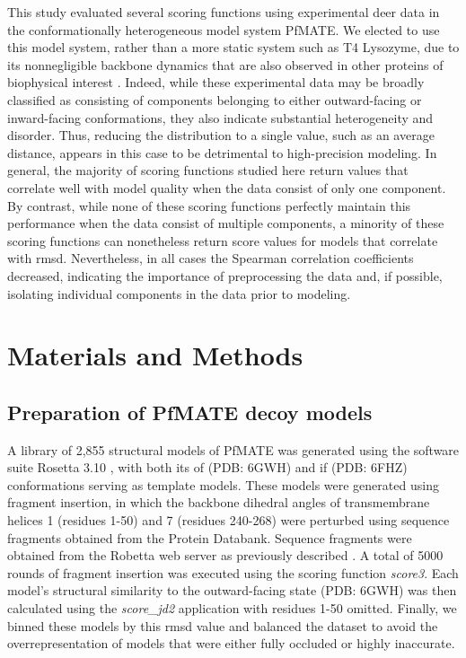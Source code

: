 This study evaluated several scoring functions using experimental \gls{deer} data in the conformationally heterogeneous model system PfMATE. We elected to use this model system, rather than a more static system such as T4 Lysozyme, due to its nonnegligible backbone dynamics that are also observed in other proteins of biophysical interest \citep*{Collauto2017, Dastvan2019, Evans2020, Martens2016, Verhalen2017a}. Indeed, while these experimental data may be broadly classified as consisting of components belonging to either outward-facing or inward-facing conformations, they also indicate substantial heterogeneity and disorder. Thus, reducing the distribution to a single value, such as an average distance, appears in this case to be detrimental to high-precision modeling. In general, the majority of scoring functions studied here return values that correlate well with model quality when the data consist of only one component. By contrast, while none of these scoring functions perfectly maintain this performance when the data consist of multiple components, a minority of these scoring functions can nonetheless return score values for models that correlate with \gls{rmsd}. Nevertheless, in all cases the Spearman correlation coefficients decreased, indicating the importance of preprocessing the data and, if possible, isolating individual components in the data prior to modeling.

\section{Materials and Methods}\label{sec:scoring_methods}

\subsection{Preparation of PfMATE decoy models}

A library of 2,855 structural models of PfMATE was generated using the software suite Rosetta 3.10 \citep*{Leaver-fay2011, Leman2020}, with both its \gls{of} (PDB: 6GWH) and \gls{if} (PDB: 6FHZ) conformations serving as template models. These models were generated using fragment insertion, in which the backbone dihedral angles of transmembrane helices 1 (residues 1-50) and 7 (residues 240-268) were perturbed using sequence fragments obtained from the Protein Databank. Sequence fragments were obtained from the Robetta web server as previously described \citep*{Kim2004}. A total of 5000 rounds of fragment insertion was executed using the scoring function \emph{score3}. Each model's structural similarity to the outward-facing state (PDB: 6GWH) was then calculated using the \emph{score\_jd2} application with residues 1-50 omitted. Finally, we binned these models by this \gls{rmsd} value and balanced the dataset to avoid the overrepresentation of models that were either fully occluded or highly inaccurate.

